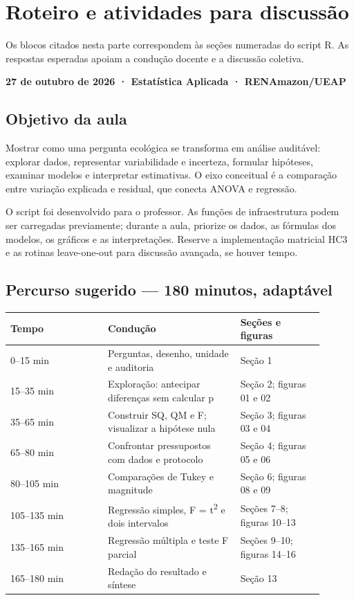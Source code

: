 \chapter{Roteiro e atividades para discussão}
Os blocos citados nesta parte correspondem às seções numeradas do script R. As respostas esperadas apoiam a condução docente e a discussão coletiva.

\textbf{27 de outubro de 2026 · Estatística Aplicada · RENAmazon/UEAP}

\section{Objetivo da aula}

Mostrar como uma pergunta ecológica se transforma em análise auditável: explorar dados, representar variabilidade e incerteza, formular hipóteses, examinar modelos e interpretar estimativas. O eixo conceitual é a comparação entre variação explicada e residual, que conecta ANOVA e regressão.

O script foi desenvolvido para o professor. As funções de infraestrutura podem ser carregadas previamente; durante a aula, priorize os dados, as fórmulas dos modelos, os gráficos e as interpretações. Reserve a implementação matricial HC3 e as rotinas leave-one-out para discussão avançada, se houver tempo.

\section{Percurso sugerido --- 180 minutos, adaptável}

\begin{table}[H]\centering\small
\begin{tabular}{p{0.28\linewidth}p{0.38\linewidth}p{0.24\linewidth}}
\toprule
Tempo & Condução & Seções e figuras\\
\midrule
0--15 min & Perguntas, desenho, unidade e auditoria & Seção 1\\
15--35 min & Exploração: antecipar diferenças sem calcular p & Seção 2; figuras 01 e 02\\
35--65 min & Construir SQ, QM e F; visualizar a hipótese nula & Seção 3; figuras 03 e 04\\
65--80 min & Confrontar pressupostos com dados e protocolo & Seção 4; figuras 05 e 06\\
80--105 min & Comparações de Tukey e magnitude & Seção 6; figuras 08 e 09\\
105--135 min & Regressão simples, F = t\textsuperscript{2} e dois intervalos & Seções 7--8; figuras 10--13\\
135--165 min & Regressão múltipla e teste F parcial & Seções 9--10; figuras 14--16\\
165--180 min & Redação do resultado e síntese & Seção 13\\
\bottomrule\end{tabular}\end{table}

